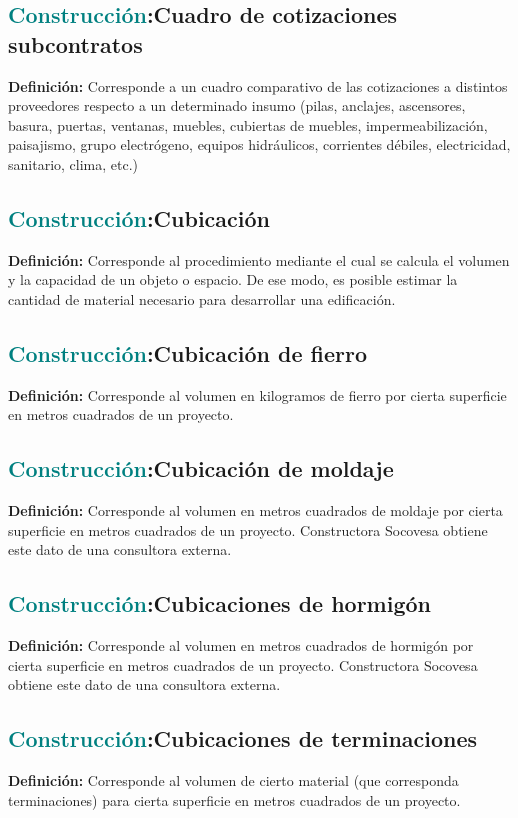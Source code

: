 \documentclass[12pt]{article}
\begin{document}
\subsection{\textcolor{teal}{Construcción}:{Cuadro de cotizaciones subcontratos}}
\textbf{Definición:} Corresponde a un cuadro comparativo de las cotizaciones a distintos proveedores respecto a un determinado insumo (pilas, anclajes, ascensores, basura, puertas, ventanas, muebles, cubiertas de muebles, impermeabilización, paisajismo, grupo electrógeno, equipos hidráulicos, corrientes débiles, electricidad, sanitario, clima, etc.)
\subsection{\textcolor{teal}{Construcción}:{Cubicación}}
\textbf{Definición:} Corresponde al procedimiento mediante el cual se calcula el volumen y la capacidad de un objeto o espacio. De ese modo, es posible estimar la cantidad de material necesario para desarrollar una edificación.
\subsection{\textcolor{teal}{Construcción}:{Cubicación de fierro}}
\textbf{Definición:} Corresponde al volumen en kilogramos de fierro por cierta superficie en metros cuadrados de un proyecto.
\subsection{\textcolor{teal}{Construcción}:{Cubicación de moldaje}}
\textbf{Definición:} Corresponde al volumen en metros cuadrados de moldaje por cierta superficie en metros cuadrados de un proyecto. Constructora Socovesa obtiene este dato de una consultora externa.
\subsection{\textcolor{teal}{Construcción}:{Cubicaciones de hormigón}}
\textbf{Definición:} Corresponde al volumen en metros cuadrados de hormigón por cierta superficie en metros cuadrados de un proyecto. Constructora Socovesa obtiene este dato de una consultora externa.
\subsection{\textcolor{teal}{Construcción}:{Cubicaciones de terminaciones}}
\textbf{Definición:} Corresponde al volumen de cierto material (que corresponda terminaciones) para cierta superficie en metros cuadrados de un proyecto.
\end{document}
